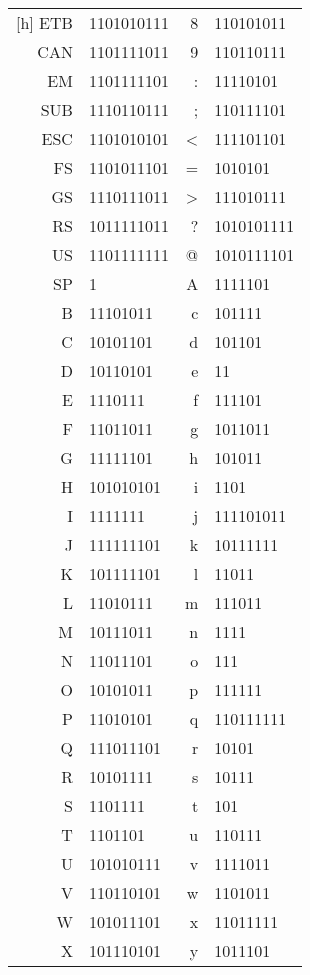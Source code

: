\begin{longtable}{ r l || r l }[h]
	ETB & 1101010111 				&	8   & 110101011  \\
	CAN & 1101111011 				&	9   & 110110111  \\
	EM  & 1101111101 				&	:   & 11110101  \\
	SUB & 1110110111 				&	;   & 110111101  \\
	ESC & 1101010101 				&	<   & 111101101  \\
	FS  & 1101011101 				&	=   & 1010101  \\
	GS  & 1110111011 				&	>   & 111010111  \\
	RS  & 1011111011 				&	?   & 1010101111  \\
	US  & 1101111111 				&	@   & 1010111101  \\
	SP  & 1 						&	A   & 1111101  \\
	B   & 11101011 					&	c   & 101111  \\
	C   & 10101101 					&	d   & 101101  \\
	D   & 10110101 					&	e   & 11  \\
	E   & 1110111 					&	f   & 111101  \\
	F   & 11011011 					&	g   & 1011011  \\
	G   & 11111101 					&	h   & 101011  \\
	H   & 101010101 				&	i   & 1101  \\
	I   & 1111111 					&	j   & 111101011  \\
	J   & 111111101 				&	k   & 10111111  \\
	K   & 101111101 				&	l   & 11011  \\
	L   & 11010111 					&	m   & 111011  \\
	M   & 10111011 					&	n   & 1111  \\
	N   & 11011101 					&	o   & 111  \\
	O   & 10101011 					&	p   & 111111  \\
	P   & 11010101 					&	q   & 110111111  \\
	Q   & 111011101 				&	r   & 10101  \\
	R   & 10101111 					&	s   & 10111  \\
	S   & 1101111 					&	t   & 101  \\
	T   & 1101101 					&	u   & 110111  \\
	U   & 101010111 				&	v   & 1111011  \\
	V   & 110110101 				&	w   & 1101011  \\
	W   & 101011101 				&	x   & 11011111  \\
	X   & 101110101 				&	y   & 1011101  \\

\end{longtable}
